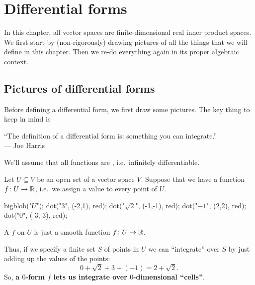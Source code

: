 \chapter{Differential forms}
\label{ch:forms_diffgeo}
In this chapter, all vector spaces are finite-dimensional
real inner product spaces.
We first start by (non-rigorously) drawing pictures
of all the things that we will define in this chapter.
Then we re-do everything again in its proper algebraic context.

\section{Pictures of differential forms}
Before defining a differential form,
we first draw some pictures.
The key thing to keep in mind is
\begin{moral}
	``The definition of a differential form is:
	something you can integrate.'' \\ --- Joe Harris
\end{moral}

We'll assume that all functions are ,
i.e.\ infinitely differentiable.

Let $U \subseteq V$ be an open set of a vector space $V$.
Suppose that we have a function $f \colon U \to \mathbb R$, i.e.\
we assign a value to every point of $U$.
\begin{center}
	\begin{asy}
		bigblob("$U$");
		dot("$3$", (-2,1), red);
		dot("$\sqrt2$", (-1,-1), red);
		dot("$-1$", (2,2), red);
		dot("$0$", (-3,-3), red);
	\end{asy}
\end{center}
\begin{definition}
	A  $f$ on $U$ is just a smooth function $f \colon U \to \mathbb R$.
\end{definition}
Thus, if we specify a finite set $S$ of points in $U$
we can ``integrate'' over $S$ by just adding up the values
of the points:
\[ 0 + \sqrt 2 + 3 + (-1) = 2 + \sqrt2. \]
So, \textbf{a $0$-form $f$ lets us integrate over $0$-dimensional ``cells''}.

